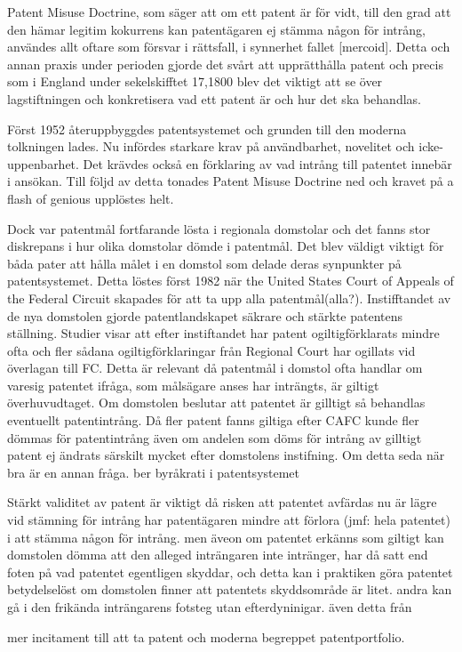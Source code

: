 Patent Misuse Doctrine, som säger att om ett patent är för vidt, till den grad att den hämar legitim
kokurrens kan patentägaren ej stämma någon för intrång, användes allt oftare som försvar i rättsfall, i
synnerhet fallet [mercoid]. Detta och annan praxis under perioden gjorde det svårt att upprätthålla patent
och precis som i England under sekelskifftet 17,1800 blev det viktigt att se över lagstiftningen och
konkretisera vad ett patent är och hur det ska behandlas.

Först 1952 återuppbyggdes patentsystemet och grunden till den moderna tolkningen lades. Nu infördes
starkare krav på användbarhet, novelitet och icke-uppenbarhet. Det krävdes också en förklaring av vad
intrång till patentet innebär i ansökan. Till följd av detta tonades Patent Misuse Doctrine ned och kravet
på a flash of genious upplöstes helt.

Dock var patentmål fortfarande lösta i regionala domstolar och det fanns stor diskrepans i hur olika
domstolar dömde i patentmål. Det blev väldigt viktigt för båda pater att hålla målet i en domstol som
delade deras synpunkter på patentsystemet. Detta löstes först 1982 när the United States Court of Appeals
of the Federal Circuit skapades för att ta upp alla patentmål(alla?). Instifftandet av de nya domstolen
gjorde patentlandskapet säkrare och stärkte patentens ställning. Studier visar att efter instiftandet har
patent ogiltigförklarats mindre ofta och fler sådana ogiltigförklaringar från Regional Court har ogillats
vid överlagan till FC. \cite{henry} Detta är relevant då patentmål i domstol ofta handlar om varesig
patentet ifråga, som målsägare anses har inträngts, är giltigt överhuvudtaget. Om domstolen beslutar att
patentet är gilltigt så behandlas eventuellt patentintrång. Då fler patent fanns giltiga efter CAFC kunde
fler dömmas för patentintrång även om andelen som döms för intrång av gilltigt patent ej ändrats särskilt
mycket efter domstolens instifning. Om detta seda när bra är en annan fråga. ber byråkrati i patentsystemet

Stärkt validitet av patent är viktigt då risken att patentet avfärdas nu är lägre vid stämning för intrång har patentägaren mindre att förlora (jmf: hela patentet) i att stämma någon för intrång. men äveon om patentet erkänns som giltigt kan domstolen dömma att den alleged inträngaren inte intränger, har då satt end foten på vad patentet egentligen skyddar, och detta kan i praktiken göra patentet betydelselöst om domstolen finner att patentets skyddsområde är litet. andra kan gå i den frikända inträngarens fotsteg utan efterdyninigar. även detta från \cite{henry}

 mer incitament till att ta patent och moderna begreppet patentportfolio.

